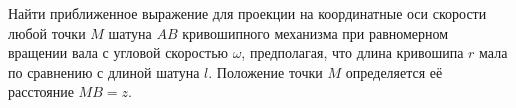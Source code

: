 Найти приближенное выражение для проекции на координатные оси скорости
любой точки $M$ шатуна $AB$ кривошипного механизма при равномерном вращении
вала с угловой скоростью $\omega$, предполагая, что длина кривошипа $r$
мала по сравнению с длиной шатуна $l$.
Положение точки $M$ определяется её расстояние $MB = z$.
